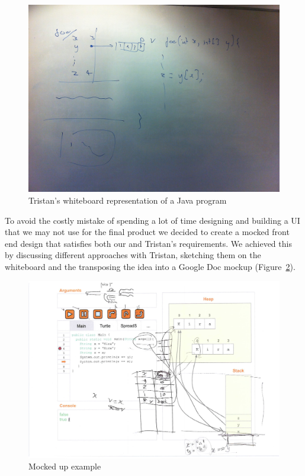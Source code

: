 \documentclass[11pt, a4paper]{article}
\begin{document}
\begin{figure}[h!]
\centering
\includegraphics[width=\textwidth]{sketch.jpg}
\caption{Tristan's whiteboard representation of a Java program}
\label{fig:sketch}
\end{figure}

To avoid the costly mistake of spending a lot of time designing and building a UI that we may not use for the final product we decided to create a mocked front end design that satisfies both our and Tristan's requirements. We achieved this by discussing different approaches with Tristan, sketching them on the whiteboard and the transposing the idea into a Google Doc mockup (Figure~\ref{fig:mockup}).

\begin{figure}[h!]
\centering
\includegraphics[width=\textwidth]{mockup.png}
\caption{Mocked up example}
\label{fig:mockup}
\end{figure}
\end{document}
